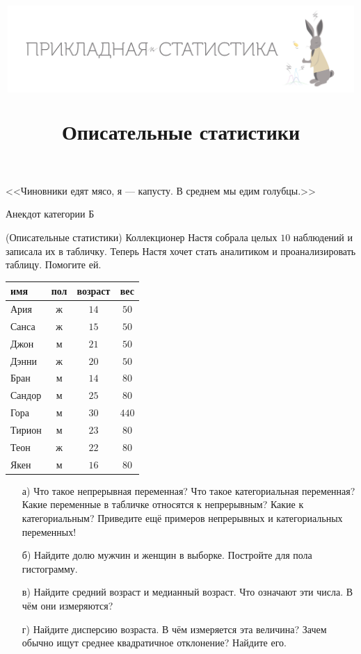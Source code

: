 \documentclass[12pt, a4paper, oneside]{article}
\title{
\begin{center} 
\includegraphics[width=0.99\textwidth]{logo.png}
\end{center}
Описательные статистики}
\date{ } %
\author{}
\begin{document}

\maketitle

\epigraph{<<Чиновники едят мясо, я — капусту. В среднем мы едим голубцы.>>}{Анекдот категории Б}

\begin{problem}{(Описательные статистики)}
Коллекционер Настя собрала целых $10$ наблюдений и записала их в табличку. Теперь Настя хочет стать аналитиком и проанализировать таблицу. Помогите ей. 

\begin{center}
	\begin{tabular}{lccc}
		\toprule
		имя & пол  & возраст  & вес  \\ \midrule
		Ария & ж  & $14$ &   $50$  \\
		Санса & ж & $15$ &  $50$  \\
		Джон & м & $21$ &  $50$   \\
		Дэнни & ж & $20$ &   $50$ \\
		Бран & м & $14$ &   $80$ \\
		Сандор & м & $25$ &   $80$\\
		Гора & м & $30$ &   $440$\\
		Тирион & м & $23$ &    $80$\\
		Теон & ж & $22$ &    $80$\\
		Якен & м & $16$  &    $80$\\ \bottomrule
	\end{tabular}	
\end{center}

\begin{enumerate}
	\item[а)] Что такое непрерывная переменная? Что такое категориальная переменная? Какие переменные в табличке относятся к непрерывным? Какие к категориальным?  Приведите ещё примеров непрерывных и категориальных переменных! 
	
	\item[б)]  Найдите долю мужчин и женщин в выборке. Постройте для пола гистограмму. 
	
	\item[в)] Найдите средний возраст и медианный возраст.  Что означают эти числа. В чём они измеряются? 

	\item[г)] Найдите дисперсию возраста. В чём измеряется эта величина? Зачем обычно ищут среднее квадратичное отклонение? Найдите его. 	
	

\end{enumerate}
\end{problem}
\end{document}
